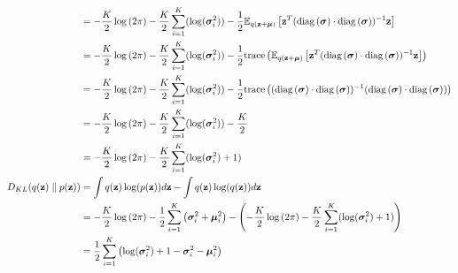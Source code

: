 \documentclass[a4paper]{article}
\begin{document}
\begin{align*}
    & = -\frac{K}{2} \log\left( 2\pi \right) -
    \frac{K}{2} \sum\limits_{i=1}^{K}(\log(\bm{\sigma}_i^2)) - 
    \frac{1}{2} {\mathbb{E}_{q(\mathbf{z} + \bm{\mu})}\left[\mathbf{z}^T (\text{diag}\left(\bm{\sigma}\right) \cdot
    \text{diag}\left(\bm{\sigma}\right))^{-1} \mathbf{z}\right]} 
    \\
    & = -\frac{K}{2} \log\left( 2\pi \right) -
    \frac{K}{2} \sum\limits_{i=1}^{K}(\log(\bm{\sigma}_i^2)) - 
    \frac{1}{2} \text{trace}\left({\mathbb{E}_{q(\mathbf{z} + \bm{\mu})}\left[\mathbf{z}^T (\text{diag}\left(\bm{\sigma}\right) \cdot
    \text{diag}\left(\bm{\sigma}\right))^{-1} \mathbf{z}\right]} \right)
    \\
    & = -\frac{K}{2} \log\left( 2\pi \right) - 
    \frac{K}{2} \sum\limits_{i=1}^{K}(\log(\bm{\sigma}_i^2)) - \frac{1}{2}
    \text{trace}\left((\text{diag}\left(\bm{\sigma}\right) \cdot \text{diag}\left(\bm{\sigma}\right))^{-1} (\text{diag}\left(\bm{\sigma}\right) \cdot
    \text{diag}\left(\bm{\sigma}\right))\right)
    \\
    & = -\frac{K}{2} \log\left( 2\pi \right) - 
    \frac{K}{2} \sum\limits_{i=1}^{K}(\log(\bm{\sigma}_i^2)) - \frac{K}{2}
    \\
    & = -\frac{K}{2} \log\left( 2\pi \right) -
    \frac{K}{2} \sum\limits_{i=1}^{K} (\log(\bm{\sigma}_i^2) + 1)
    \\
    D_{KL}(q(\mathbf{z}) \parallel p(\mathbf{z})) & = 
    \int q(\mathbf{z}) \log(p(\mathbf{z})) d\mathbf{z} - \int q(\mathbf{z}) \log(q(\mathbf{z})) d\mathbf{z} 
    \\
    & = -\frac{K}{2} \log\left( 2\pi \right) - \frac{1}{2}
    \sum\limits_{i=1}^{K} \left( \bm{\sigma}_i^2 + \bm{\mu}_i^2 \right)
    - \left(-\frac{K}{2} \log\left( 2\pi \right) -
    \frac{K}{2} \sum\limits_{i=1}^{K} (\log(\bm{\sigma}_i^2) + 1) \right)
    \\
    & = \frac{1}{2} \sum\limits_{i=1}^{K} \left( \log(\bm{\sigma}_i^2) + 1 - \bm{\sigma}_i^2 - \bm{\mu}_i^2\right)
\end{align*}
\end{document}
